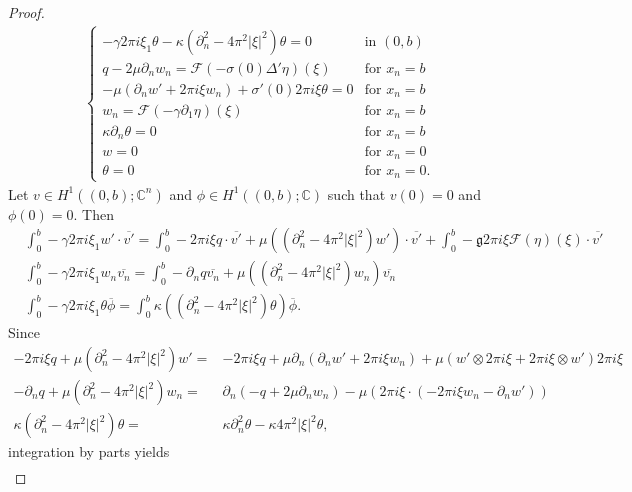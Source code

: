 \documentclass[11pt,letterpaper,reqno]{amsart}
\numberwithin{equation}{section}
\newcommand{\abs}[1]{\left\lvert#1\right\rvert}
\begin{document}
\begin{proof}
\begin{align}
\begin{cases}
            -\gamma2\pi i \xi_{1}\theta-\kappa(\partial_{n}^{2}-4\pi^{2}\abs{\xi}^{2})\theta=0 &\mbox{in \((0,b)\)} \\
            q-2\mu\partial_{n}w_{n}=\mathcal{F}(-\sigma(0)\Delta'\eta)(\xi) &\mbox{for \(x_{n}=b\)} \\
            -\mu(\partial_{n}w'+2\pi i \xi w_{n})+\sigma'(0)2\pi i \xi\theta=0 &\mbox{for \(x_{n}=b\)} \\
            w_{n}=\mathcal{F}(-\gamma\partial_{1}\eta)(\xi) &\mbox{for \(x_{n}=b\)} \\
            \kappa\partial_{n}\theta=0 &\mbox{for \(x_{n}=b\)} \\
            w=0 &\mbox{for \(x_{n}=0\)} \\
            \theta=0 &\mbox{for \(x_{n}=0\)}.
        \end{cases}
    \end{align}
    Let \(v \in H^{1}((0,b);\mathbb{C}^{n})\) and \(\phi \in H^{1}((0,b);\mathbb{C})\) such that \(v(0)=0\) and \(\phi(0)=0\). Then
    \begin{align}
        &\int_{0}^{b}-\gamma 2\pi i \xi_{1}w'\cdot\overline{v'}=\int_{0}^{b}-2\pi i \xi q \cdot\overline{v'}+\mu((\partial_{n}^{2}-4\pi^{2}\abs{\xi}^{2})w')\cdot\overline{v'}+\int_{0}^{b}-\mathfrak{g}2\pi i \xi\mathcal{F}(\eta)(\xi)\cdot\overline{v'} \nonumber\\
        &\int_{0}^{b}-\gamma 2\pi i \xi_{1}w_{n}\overline{v_{n}}=\int_{0}^{b}-\partial_{n}q\overline{v_{n}}+\mu((\partial_{n}^{2}-4\pi^{2}\abs{\xi}^{2})w_{n})\overline{v_{n}} \nonumber\\
        &\int_{0}^{b}-\gamma 2\pi i \xi_{1}\theta\overline{\phi}=\int_{0}^{b}\kappa((\partial_{n}^{2}-4\pi^{2}\abs{\xi}^{2})\theta)\overline{\phi}.
    \end{align}
   Since
    \begin{align}
        -2\pi i\xi q+\mu(\partial_{n}^{2}-4\pi^{2}\abs{\xi}^{2})w'=& -2\pi i\xi q+\mu\partial_{n}(\partial_{n}w'+2\pi i \xi w_{n})+\mu(w' \otimes 2\pi i \xi+2\pi i \xi \otimes w')2\pi i \xi \nonumber\\
        -\partial_{n}q+\mu(\partial_{n}^{2}-4\pi^{2}\abs{\xi}^{2})w_{n}=&\partial_{n}(-q+2\mu\partial_{n}w_{n})-\mu(2\pi i\xi \cdot (-2\pi i \xi w_{n}-\partial_{n}w')) \nonumber \\
        \kappa(\partial_{n}^{2}-4\pi^{2}\abs{\xi}^{2})\theta=&\kappa\partial_{n}^{2}\theta-\kappa 4\pi^{2}\abs{\xi}^{2}\theta,
    \end{align}
    integration by parts yields
    \begin{align}

\end{align}
\end{proof}
\end{document}
